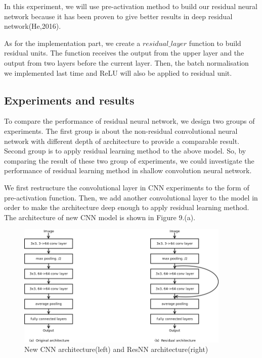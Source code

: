\documentclass[]{article}
\begin{document}
In this experiment, we will use pre-activation method to build our residual neural network because it has been proven to give better results in deep residual network(He,2016).

As for the implementation part, we create a $residual\_layer$ function to build residual units. The function receives the output from the upper layer and the output from two layers before the current layer. Then, the batch normalisation we implemented last time and ReLU will also be applied to residual unit.

\subsection{Experiments and results}

To compare the performance of residual neural network, we design two groups of experiments. The first group is about the non-residual convolutional neural network with different depth of architecture to provide a comparable result. Second group is to apply residual learning method to the above model. So, by comparing the result of these two group of experiments, we could investigate the performance of residual learning method in shallow convolution neural network.

We first restructure the convolutional layer in CNN experiments to the form of pre-activation function. Then, we add another convolutional layer to the model in order to make the architecture deep enough to apply residual learning method. The architecture of new CNN model is shown in Figure 9.(a).

\begin{figure}[!h]
\begin{center}
\includegraphics[width = 4in]{residual_architecture}
\caption{New CNN architecture(left) and ResNN architecture(right)}
\end{center}
\end{figure}
\end{document}
